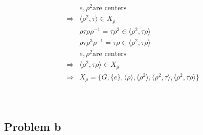 \documentclass{article}
\begin{document}
\begin{equation*}
\begin{split}
        &e,\rho^2\text{are centers}\\
        \Rightarrow&\langle\rho^2,\tau\rangle\in X_\rho\\
        &\rho\tau\rho\rho^{-1}=\tau\rho^3\in\langle\rho^2,\tau\rho\rangle\\
        &\rho\tau\rho^3\rho^{-1}=\tau\rho\in\langle\rho^2,\tau\rho\rangle\\
        &e,\rho^2\text{are centers}\\
        \Rightarrow&\langle\rho^2,\tau\rho\rangle\in X_\rho\\
        \Rightarrow&X_\rho=\{G,\{e\},\langle\rho\rangle,\langle\rho^2\rangle,\langle\rho^2,\tau\rangle,\langle\rho^2,\tau\rho\rangle\}\\
    \end{split}
\end{equation*}

~

\subsection*{Problem b}

~
\end{document}
